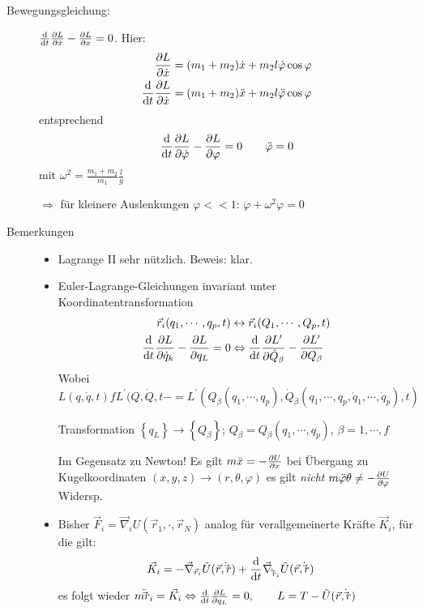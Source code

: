 \begin{enumerate}
\begin{description}
\item[Bewegungsgleichung:]
  $\frac{\text{d} }{\text{d} t}\frac{\partial L}{\partial \dot{x}} - \frac{\partial 
    L}{\partial x} = 0$.
  Hier:
\begin{align*}
  \frac{\partial L}{\partial \dot{x}}
  &= (m_1+m_2)\dot{x}+m_2l\dot{\varphi}\cos\varphi\\
  \frac{\text{d} }{\text{d} t}\frac{\partial L}{\partial \dot{x}}
  &= (m_1+m_2)\ddot{x} + m_2l\ddot{\varphi}\cos\varphi\\
\end{align*}
entsprechend
\begin{equation*}
\frac{\text{d} }{\text{d} t}\frac{\partial L}{\partial \dot{\varphi}}-\frac{\partial L}{\partial \varphi} = 0
\qquad \ddot{\varphi} = 0
\end{equation*}
mit $\omega^2=\frac{m_1+m_2}{m_1}\frac{l}{g}$

$\Rightarrow$ für kleinere Auslenkungen $\varphi<<1$: $\ddot{\varphi}+\omega^2\varphi=0$

\item[Bemerkungen]
\begin{itemize}
\item Lagrange II sehr nützlich. Beweis: klar.

\item Euler-Lagrange-Gleichungen invariant unter
  Koordinatentransformation
  \begin{align*}
    \vec{r}_i(q_1,\cdots,q_p,t)
    &\leftrightarrow \vec{r}_i(Q_1,\cdots,Q_p,t)\\
    \frac{\text{d} }{\text{d} t}\frac{\partial L}{\partial \dot{q}_k}-\frac{\partial L}{\partial q_L} = 0
    &\Leftrightarrow \frac{\text{d} }{\text{d} t} \frac{\partial L^{\prime}}{\partial \dot{Q}_{\beta}}
      - \frac{\partial L^{\prime}}{\partial Q_{\beta}}
  \end{align*}
  Wobei
  $L(q,\dot{q},t) f L^{\prime}(Q,\dot{Q},t- =
  L^{\prime}(Q_{\beta}(q_1,\cdots,q_p),\dot{Q}_{\beta}(q_1,\cdots,q_p,
  \dot{q}_1,\cdots,\dot{q}_p),t)$

  Transformation
  $\left\{ q_L \right\} \rightarrow \left\{ Q_{\beta} \right\}$;
  $Q_{\beta}=Q_{\beta}(q_1,\cdots,q_p)$, $\beta = 1,\cdots,f$

  Im Gegensatz zu Newton!  Es gilt
  $m\ddot{x} = - \frac{\partial U}{\partial x}$ bei Übergang zu
  Kugelkoordinaten $(x,y,z)\rightarrow(r,\theta,\varphi)$ es gilt
  \emph{nicht}
  $m\ddot{\varphi} \theta \not= - \frac{\partial U}{\partial \varphi}$ Widersp.
\item Bisher $\vec{F}_i = \vec{\nabla}_iU(\vec{r}_1,\cdot,\vec{r}_N)$
  analog für verallgemeinerte Kräfte $\vec{K}_i$, für die gilt:
  \begin{align*}
    \vec{K}_i &= -\vec{\nabla}_{\vec{r}_i}\tilde{U}(\vec{r},\dot\vec{r})
                + \frac{\text{d} }{\text{d} t}\vec{\nabla}_{\dot\vec{r}_i} \tilde{U}(\vec{r},\dot\vec{r})
  \end{align*}
  es folgt wieder
  $m\ddot\vec{r}_i = \vec{K}_{i} \Leftrightarrow
  \frac{\text{d} }{\text{d} t}\frac{\partial L}{\partial q_L} = 0, \qquad L = T -
  \tilde{U}(\vec{r},\dot\vec{r})$


\end{itemize}
\end{description}
\end{enumerate}
